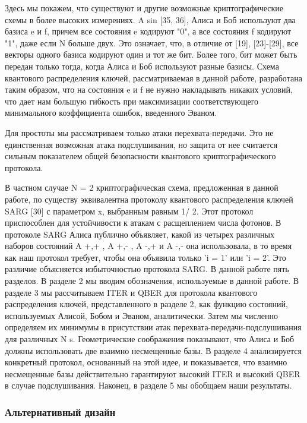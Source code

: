Здесь мы покажем, что существуют и другие возможные криптографические схемы в более высоких измерениях. A sin [35, 36], Алиса и Боб используют два базиса e и f, причем все состояния e кодируют "0", а все состояния f кодируют "1", даже если N больше двух. Это означает, что, в отличие от [19], [23]-[29], все векторы одного базиса кодируют один и тот же бит. Более того, бит может быть передан только тогда, когда Алиса и Боб используют разные базисы. Схема квантового распределения ключей, рассматриваемая в данной работе, разработана таким образом, что на состояния e и f не нужно накладывать никаких условий, что дает нам большую гибкость при максимизации соответствующего минимального коэффициента ошибок, введенного Эваном.

Для простоты мы рассматриваем только атаки перехвата-передачи. Это не единственная возможная атака подслушивания, но защита от нее считается сильным показателем общей безопасности квантового криптографического протокола.

В частном случае N = 2 криптографическая схема, предложенная в данной работе, по существу эквивалентна протоколу квантового распределения ключей SARG [30] с параметром x, выбранным равным 1/ 2. Этот протокол приспособлен для устойчивости к атакам с расщеплением числа фотонов. В протоколе SARG Алиса публично объявляет, какой из четырех различных наборов состояний A +,+ , A +,- , A -,+ и A -,- она использовала, в то время как наш протокол требует, чтобы она объявила только 'i = 1' или 'i = 2'. Это различие объясняется избыточностью протокола SARG.
В данной работе пять разделов. В разделе 2 мы вводим обозначения, используемые в данной работе. В разделе 3 мы рассчитываем ITER и QBER для протокола квантового распределения ключей, представленного в разделе 2, как функцию состояний, используемых Алисой, Бобом и Эваном, аналитически. Затем мы численно определяем их минимумы в присутствии атак перехвата-передачи-подслушивания для различных N s. Геометрические соображения показывают, что Алиса и Боб должны использовать две взаимно несмещенные базы. В разделе 4 анализируется конкретный протокол, основанный на этой идее, и показывается, что взаимно несмещенные базы действительно гарантируют высокий ITER и высокий QBER в случае подслушивания. Наконец, в разделе 5 мы обобщаем наши результаты.

\subsubsection{Альтернативный дизайн}

